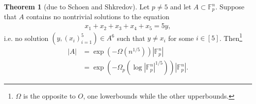 \documentclass{article}
\theoremstyle{definition}
\newtheorem{theorem}{Theorem}[section]
\begin{document}
\begin{theorem}[due to Schoen and Shkredov]\label{theorem3.10}
    Let $p \neq 5$ and let $A \subset \mathbb{F}_p^n$. Suppose that $A$ contains no nontrivial solutions to the equation 
    \begin{align*}
        x_1 + x_2 + x_3 + x_4 + x_5 = 5y,
    \end{align*}
    i.e. no solution $(y,(x_i)_{i=1}^5) \in A^6$ such that $y \neq x_i$ for some $i \in [5]$. Then\footnote{$\Omega$ is the opposite to $O$, one lowerbounds while the other upperbounds.}
    \begin{align*}
        \left|A\right| &= \exp \left(-\Omega \left(n^{1/5}\right)\right)\left|\mathbb{F}_p^n\right| \\
        &= \exp (-\Omega_p (\log \left|\mathbb{F}_p^n\right|^{1/5}))\left|\mathbb{F}_p^n\right|.
    \end{align*}
\end{theorem}
\end{document}

